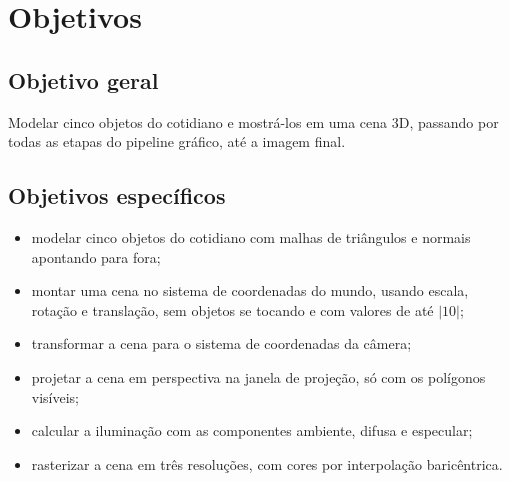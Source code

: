 \section{Objetivos}\label{sec:objetivos}

\subsection{Objetivo geral}\label{sec:obj-geral}

Modelar cinco objetos do cotidiano e mostrá-los em uma cena 3D, passando por todas as etapas do
pipeline gráfico, até a imagem final.

\subsection{Objetivos específicos}\label{sec:obj-especificos}

\begin{itemize}
  \item modelar cinco objetos do cotidiano com malhas de triângulos e normais apontando para fora;
  \item montar uma cena no sistema de coordenadas do mundo, usando escala, rotação e translação, sem objetos se tocando e com valores de até $|10|$;
  \item transformar a cena para o sistema de coordenadas da câmera;
  \item projetar a cena em perspectiva na janela de projeção, só com os polígonos visíveis;
  \item calcular a iluminação com as componentes ambiente, difusa e especular;
  \item rasterizar a cena em três resoluções, com cores por interpolação baricêntrica.
\end{itemize}
